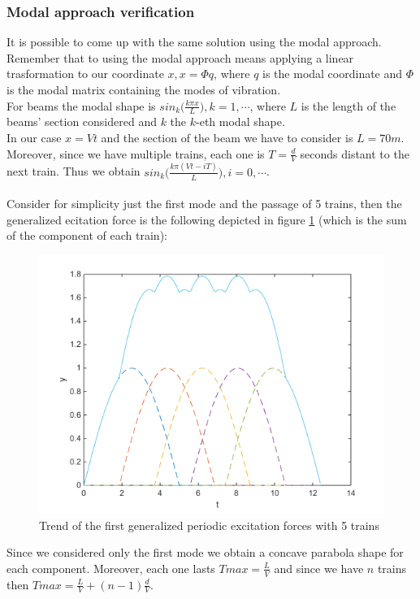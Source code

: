 \documentclass[10pt,a4paper,final]{report}
\begin{document}
\subsubsection{Modal approach verification}
It is possible to come up with the same solution using the modal approach. Remember that to using the modal approach means applying a linear trasformation to our coordinate $x, x=\Phi q$, where $q$ is the modal coordinate and $\Phi$ is the modal matrix containing the modes of vibration. \\
For beams the modal shape is $sin_k\Big(\frac{k\pi x}{L}\Big),k=1,\cdots$, where $L$ is the length of the beams' section considered and $k$ the $k$-eth modal shape. \\
In our case $x=Vt$ and the section of the beam we have to consider is $L=70m$. Moreover, since we have multiple trains, each one is $T=\frac{d}{V}$ seconds distant to the next train. Thus we obtain $sin_k\Big(\frac{k\pi(Vt-iT)}{L}\Big), i=0,\cdots$. \\ \\
Consider for simplicity just the first mode and the passage of 5 trains, then the generalized ecitation force is the following depicted in figure \ref{fig:train3} (which is the sum of the component of each train):
\begin{figure}[h]
        \centering
                \includegraphics[width=\textwidth]{train3}
                \caption{Trend of the first generalized periodic excitation forces with 5 trains}
                \label{fig:train3}
\end{figure}
Since we considered only the first mode we obtain a concave parabola shape for each component. Moreover, each one lasts $Tmax=\frac{L}{V}$ and since we have $n$ trains then $Tmax =\frac{L}{V} + (n-1)\frac{d}{V}$.
\end{document}
